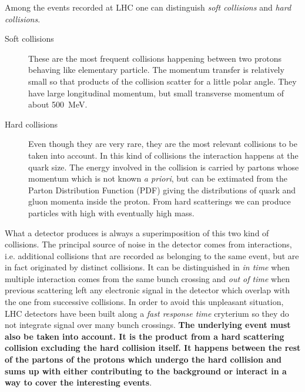 Among the events recorded at LHC one can distinguish \emph{soft collisions} and \emph{hard collisions}.
\begin{description}
\item[Soft collisions] These are the most frequent collisions happening between two protons behaving like elementary particle. The momentum transfer is relatively small so that products of the collision scatter for a little polar angle. They have large longitudinal \mbox{momentum}, but small transverse momentum \pt of about \SI{500}{\MeV}.
\item[Hard collisions] Even though they are very rare, they are the most relevant collisions to be taken into account. In this kind of collisions the interaction happens at the quark size. The energy involved in the collision is carried by partons whose momentum which is not known \emph{a priori}, but can be extimated from the Parton Distribution Function (PDF) giving the distributions of quark and gluon momenta inside the proton. From hard scatterings we can produce particles with high \pt with eventually high mass.
\end{description}

What a detector produces is always a superimposition of this two kind of collisions. The principal source of noise in the detector comes from \pileup interactions, i.e. additional \pp collisions that are recorded as belonging to the same event, but are in fact originated by distinct collisions. It can be distinguished in \emph{in time \pileup} when multiple interaction comes from the same bunch crossing and \emph{out of time \pileup} when previous scattering left any electronic signal in the detector which overlap with the one from successive collisions. In order to avoid this unpleasant situation, LHC detectors have been built along a \emph{fast response time} cryterium so they do not integrate signal over many bunch crossings. \textbf{The underlying event must also be taken into account. It is the product from a hard scattering collision excluding the hard collision itself. It happens between the rest of the partons of the protons which undergo the hard collision and sums up with \pileup either contributing to the background or interact in a way to cover the interesting events}.


